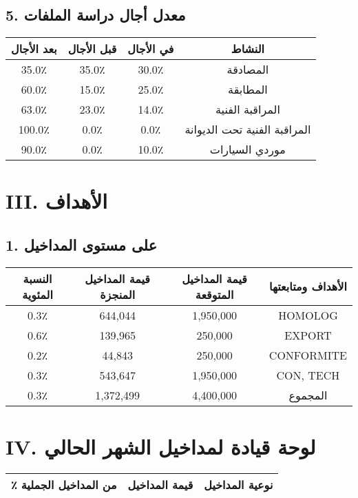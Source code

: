 \documentclass[a4paper,12pt]{article}
\begin{document}
\subsection*{5. معدل أجال دراسة الملفات}
\begin{tabular}{cccc}
\toprule
\textbf{بعد الأجال} & \textbf{قبل الأجال} & \textbf{في الأجال} & \textbf{النشاط} \\
\midrule
35.0٪ & 35.0٪ & 30.0٪ & المصادقة \\
60.0٪ & 15.0٪ & 25.0٪ & المطابقة \\
63.0٪ & 23.0٪ & 14.0٪ & المراقبة الفنية \\
100.0٪ & 0.0٪ & 0.0٪ & المراقبة الفنية تحت الديوانة \\
90.0٪ & 0.0٪ & 10.0٪ & موردي السيارات \\

\bottomrule
\end{tabular}

\section*{III. الأهداف}
\subsection*{1. على مستوى المداخيل}
\begin{tabular}{cccc}
\toprule
\textbf{النسبة المئوية} & \textbf{قيمة المداخيل المنجزة} & \textbf{قيمة المداخيل المتوقعة} & \textbf{الأهداف ومتابعتها} \\
\midrule
0.3٪ & 644,044 & 1,950,000 & HOMOLOG \\
0.6٪ & 139,965 & 250,000 & EXPORT \\
0.2٪ & 44,843 & 250,000 & CONFORMITE \\
0.3٪ & 543,647 & 1,950,000 & CON, TECH \\
0.3٪ & 1,372,499 & 4,400,000 & المجموع \\

\bottomrule
\end{tabular}

\section*{IV. لوحة قيادة لمداخيل الشهر الحالي}
\begin{tabular}{ccc}
\toprule
\textbf{٪ من المداخيل الجملية} & \textbf{قيمة المداخيل} & \textbf{نوعية المداخيل} \\
\midrule

\bottomrule
\end{tabular}
\end{document}
